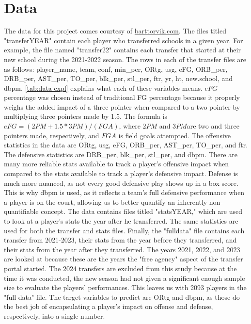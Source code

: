 \documentclass[12pt]{article}
\begin{document}
\section{Data}
\label{sec:data}
The data for this project comes courtesy of \href{barttorvik.com}{barttorvik.com}. The files titled "transferYEAR" contain each player who transferred schools in a given year. For example, the file named "transfer22" contains each transfer that started at their new school during the 2021-2022 season. The rows in each of the transfer files are as follows: player\_name, team, conf, min\_per, ORtg, usg, eFG, ORB\_per, DRB\_per, AST\_per, TO\_per, blk\_per, stl\_per, ftr, yr, ht, new.school, and dbpm. \autoref{tab:data-expl} explains what each of these variables means. \(eFG\) percentage was chosen instead of traditional FG percentage because it properly weighs the added impact of a three pointer when compared to a two pointer by multiplying three pointers made by 1.5. The formula is \(eFG=(2PM+1.5*3PM)/(FGA)\), where \(2PM\) and \(3PM \)are two and three pointers made, respectively, and \(FGA\) is field goals attempted. The offensive statistics in the data are ORtg, usg, eFG, ORB\_per, AST\_per, TO\_per, and ftr. The defensive statistics are DRB\_per, blk\_per, stl\_per, and dbpm. There are many more reliable stats available to track a player's offensive impact when compared to the stats available to track a player's defensive impact. Defense is much more nuanced, as not every good defensive play shows up in a box score. This is why dbpm is used, as it reflects a team's full defensive performance when a player is on the court, allowing us to better quantify an inherently non-quantifiable concept. The data contains files titled "statsYEAR," which are used to look at a player's stats the year after he transferred. The same statistics are used for both the transfer and stats files. Finally, the "fulldata" file contains each transfer from 2021-2023, their stats from the year before they transferred, and their stats from the year after they transferred. The years 2021, 2022, and 2023 are looked at because these are the years the "free agency" aspect of the transfer portal started. The 2024 transfers are excluded from this study because at the time it was conducted, the new season had not given a significant enough sample size to evaluate the players' performances. This leaves us with 2093 players in the "full data" file. The target variables to predict are ORtg and dbpm, as those do the best job of encapsulating a player's impact on offense and defense, respectively, into a single number.
\end{document}
